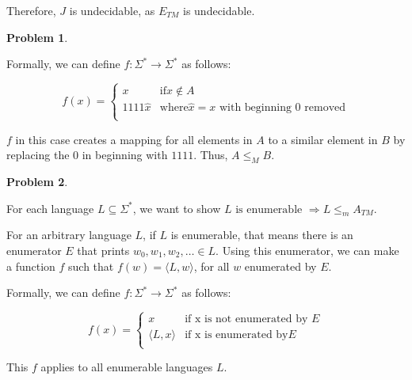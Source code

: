 \documentclass[11pt]{article}
\theoremstyle{definition}
\theoremstyle{case}
\theoremstyle{theorem}
\newtheorem{prob}{Problem}
\begin{document}
Therefore, $J$ is undecidable, as $E_{TM}$ is undecidable.

\begin{prob}\end{prob}

Formally, we can define $f: \Sigma^* \rightarrow \Sigma^*$ as follows:

\[ f(x) = \begin{cases}

    x & \text{if} x \notin A \\

    1111\hat{x} & \text{where} \hat{x} = x \text{ with beginning 0 removed} \\

    \end{cases}
\]

$f$ in this case creates a mapping for all elements in $A$ to a similar element in $B$
by replacing the $0$ in beginning with $1111$. Thus, $A \leq_{M} B$.

\begin{prob}\end{prob}

For each language $L \subseteq \Sigma^*$, we want to show $L \text{ is enumerable } \Rightarrow L \leq_{m} A_{TM}$.

For an arbitrary language $L$, if $L$ is enumerable, that means there is an enumerator $E$ that
prints $w_0, w_1, w_2, \hdots \in L$. Using this enumerator, we can make a function $f$ such
that $f(w) = \langle L, w \rangle$, for all $w$ enumerated by $E$.

Formally, we can define $f: \Sigma^* \rightarrow \Sigma^*$ as follows:

\[ f(x) = \begin{cases}

    x & \text{if x is not enumerated by } E\\

    \langle L, x \rangle & \text{if x is enumerated by} E\\

    \end{cases}
\]

This $f$ applies to all enumerable languages $L$.
\end{document}
